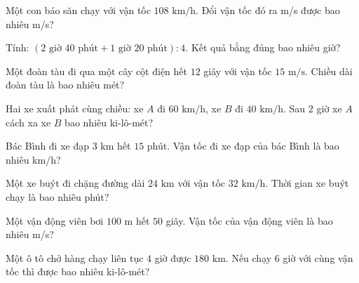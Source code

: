 \begin{ex}
  Một con báo săn chạy với vận tốc $108\text{ km/h}$. Đổi vận tốc đó ra m/s được bao nhiêu m/s?
\end{ex}

\begin{ex}
  Tính: $(2\text{ giờ } 40\text{ phút} + 1\text{ giờ } 20\text{ phút}) : 4$. Kết quả bằng đúng bao nhiêu giờ?
\end{ex}

\begin{ex}
  Một đoàn tàu đi qua một cây cột điện hết $12$ giây với vận tốc $15\text{ m/s}$. Chiều dài đoàn tàu là bao nhiêu mét?
\end{ex}

\begin{ex}
  Hai xe xuất phát cùng chiều: xe $A$ đi $60\text{ km/h}$, xe $B$ đi $40\text{ km/h}$. Sau $2$ giờ xe $A$ cách xa xe $B$ bao nhiêu ki-lô-mét?
\end{ex}

\begin{ex}
  Bác Bình đi xe đạp $3\text{ km}$ hết $15$ phút. Vận tốc đi xe đạp của bác Bình là bao nhiêu km/h?
\end{ex}

\begin{ex}
  Một xe buýt đi chặng đường dài $24\text{ km}$ với vận tốc $32\text{ km/h}$. Thời gian xe buýt chạy là bao nhiêu phút?
\end{ex}

\begin{ex}
  Một vận động viên bơi $100\text{ m}$ hết $50$ giây. Vận tốc của vận động viên là bao nhiêu m/s?
\end{ex}

\begin{ex}
  Một ô tô chở hàng chạy liên tục $4$ giờ được $180\text{ km}$. Nếu chạy $6$ giờ với cùng vận tốc thì được bao nhiêu ki-lô-mét?
\end{ex}

